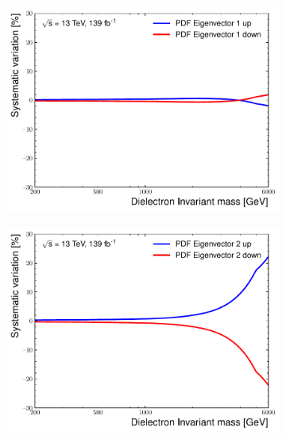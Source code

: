 \begin{figure}[h!]
    \centering
    \begin{subfigure}[b]{0.42\textwidth}
        \centering
        \includegraphics[width=\textwidth]{figures/analysis/datamc/Uncertainties/theory/ee/backgroundTemplate_KF_PDF_EV1.pdf}
        \label{fig:uncert:eepdfvar1}
    \end{subfigure}
    \begin{subfigure}[b]{0.42\textwidth}
        \centering
        \includegraphics[width=\textwidth]{figures/analysis/datamc/Uncertainties/theory/ee/backgroundTemplate_KF_PDF_EV2.pdf}
        \label{fig:uncert:eepdfvar2}
    \end{subfigure}
    \begin{subfigure}[b]{0.42\textwidth}

\end{subfigure}
\end{figure}

